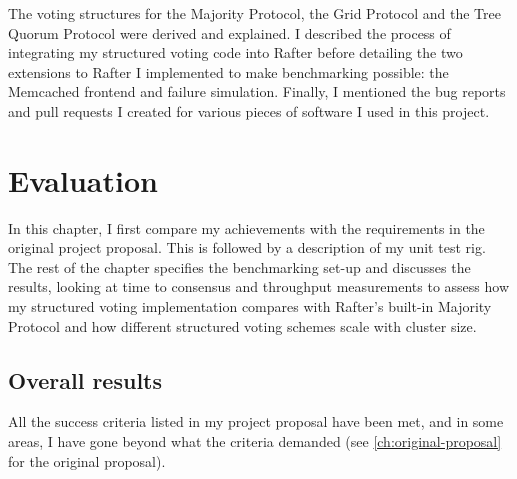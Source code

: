 \documentclass[12pt,chapterprefix=true,toc=bibliography,numbers=noendperiod,
               footnotes=multiple,twoside]{scrreprt}
\begin{document}
The voting structures for the Majority Protocol, the Grid Protocol and the Tree Quorum Protocol were derived and explained. I described the process of integrating my structured voting code into Rafter before detailing the two extensions to Rafter I implemented to make benchmarking possible: the Memcached frontend and failure simulation. Finally, I mentioned the bug reports and pull requests I created for various pieces of software I used in this project.



\chapter{Evaluation}
\label{ch:evaluation}



In this chapter, I first compare my achievements with the requirements in the original project proposal. This is followed by a description of my unit test rig. The rest of the chapter specifies the benchmarking set-up and discusses the results, looking at time to consensus and throughput measurements to assess how my structured voting implementation compares with Rafter's built-in Majority Protocol and how different structured voting schemes scale with cluster size.

\section{Overall results}
\label{sc:overall-results}

All the success criteria listed in my project proposal have been met, and in some areas, I have gone beyond what the criteria demanded (see \cref{ch:original-proposal} for the original proposal).
\end{document}
